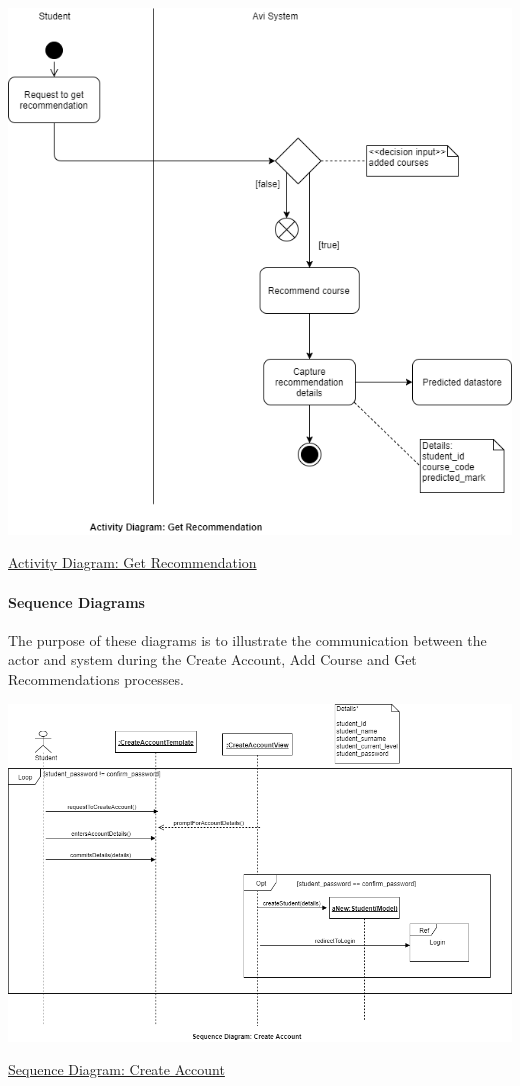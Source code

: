 \documentclass[10pt]{article}
\begin{document}
\begin{center}
\includegraphics[width=.9\textwidth]{activity_diagram_get.png}
\end{center}
\caption{\underline{Activity Diagram: Get Recommendation}}

\paragraph{Sequence Diagrams \\}

The purpose of these diagrams is to illustrate the communication between the actor and system during the Create Account, Add Course and Get Recommendations processes.

\begin{center}
\includegraphics[width=.9\textwidth]{sequence_diagram_create.png}
\end{center}
\caption{\underline{Sequence Diagram: Create Account}}
\end{document}
